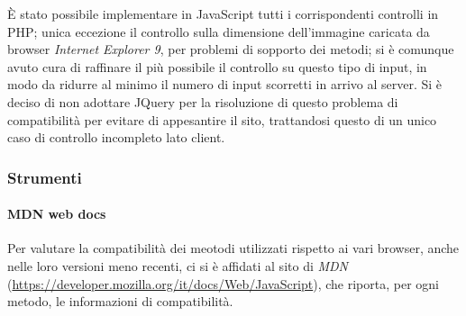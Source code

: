 È stato possibile implementare in JavaScript tutti i corrispondenti controlli in PHP; unica eccezione il controllo sulla dimensione dell'immagine caricata da browser \textit{Internet Explorer 9}, per problemi di sopporto dei metodi; si è comunque avuto cura di raffinare il più possibile il controllo su questo tipo di input, in modo da ridurre al minimo il numero di input scorretti in arrivo al server. Si è deciso di non adottare JQuery per la risoluzione di questo problema di compatibilità per evitare di appesantire il sito, trattandosi questo di un unico caso di controllo incompleto lato client.


\subsubsection{Strumenti}
\label{implementazione-javascript-strumenti}

\paragraph{MDN web docs}
\label{implementazione-javascript-strumenti-mdn}
Per valutare la compatibilità dei meotodi utilizzati rispetto ai vari browser, anche nelle loro versioni meno recenti, ci si è affidati al sito di \textit{MDN} (\url{https://developer.mozilla.org/it/docs/Web/JavaScript}), che riporta, per ogni metodo, le informazioni di compatibilità.


